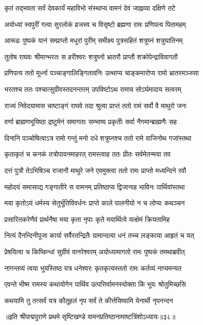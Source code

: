 \twolineshloka
{कृतं तद्भवता सर्वं देवकार्यं महाविभो}
{संस्थाप्य वामनं देवं जाह्नव्या दक्षिणे तटे}%

\twolineshloka
{अयोध्यां स्वपुरीं गत्वा सुरलोकं व्रजस्व च}
{विसृष्टो ब्रह्मणा रामः प्रणिपत्य पितामहम्}%

\twolineshloka
{आरूढः पुष्पकं यानं सम्प्राप्तो मधुरां पुरीम्}
{समीक्ष्य पुत्रसहितं शत्रुघ्नं शत्रुघातिनम्}%

\twolineshloka
{तुतोष राघवः श्रीमान्भरतः स हरीश्वरः}
{शत्रुघ्नो भ्रातरौ प्राप्तौ शक्रोपेन्द्राविवागतौ}%

\twolineshloka
{प्रणिपत्य ततो मूर्ध्ना पञ्चाङ्गालिङ्गितावनिः}
{उत्थाप्य चाङ्कमारोप्य रामो भ्रातरमञ्जसा}%

\twolineshloka
{भरतश्च ततः पश्चात्सुग्रीवस्तदनन्तरम्}
{उपविष्टोऽथ रामाय सोऽर्घमादाय सत्वरम्}%

\twolineshloka
{राज्यं निवेदयामास चाष्टाङ्गं राघवे तदा}
{श्रुत्वा प्राप्तं ततो रामं सर्वो वै माथुरो जनः}%

\twolineshloka
{वर्णा ब्राह्मणभूयिष्ठा द्रष्टुमेनं समागताः}
{सम्भाष्य प्रकृतीः सर्वा नैगमान्ब्राह्मणैः सह}%

\twolineshloka
{दिनानि पञ्चोषित्वाऽत्र रामो गन्तुं मनो दधे}
{शत्रुघ्नश्च ततो रामे वाजिनोथ गजांस्तथा}%

\twolineshloka
{कृताकृतं च कनकं तत्रोपायनमाहरत्}
{रामस्त्वाह ततः प्रीतः सर्वमेतन्मया तव}%

\twolineshloka
{दत्तं पुत्रौ तेऽभिषिञ्च राजानौ माथुरे जने}
{एवमुक्त्वा ततो रामः प्राप्तो मध्यन्दिने रवौ}%

\twolineshloka
{महोदयं समासाद्य गङ्गातीरे स वामनम्}
{प्रतिष्ठाप्य द्विजानाह भाविनः पार्थिवांस्तथा}%

\twolineshloka
{मया कृतोऽयं धर्मस्य सेतुर्भूतिविवर्धनः}
{प्राप्ते काले पालनीयो न च लोप्यः कथञ्चन}%

\twolineshloka
{प्रसारितकरेणैवं प्रार्थनैषा मया कृता}
{नृपाः कृते मयार्थित्वे यत्क्षेमं क्रियतामिह}%

\twolineshloka
{नित्यं दैनन्दिनीपूजा कार्या सर्वैरतन्द्रितैः}
{ग्रामान्दत्वा धनं तच्च लङ्काया आहृतं च यत्}%

\twolineshloka
{प्रेषयित्वा च किष्किन्धां सुग्रीवं वानरेश्वरम्}
{अयोध्यामागतो रामः पुष्पकं तमथाब्रवीत्}%

\twolineshloka
{नागन्तव्यं त्वया भूयस्तिष्ठ यत्र धनेश्वरः}
{कृतकृत्यस्ततो रामः कर्तव्यं नाप्यमन्यत}%


\twolineshloka
{एवन्ते भीष्म रामस्य कथायोगेन पार्थिव}
{उत्पत्तिर्वामनस्योक्ता किं भूयः श्रोतुमिच्छसि}%

\twolineshloka
{कथयामि तु तत्सर्वं यत्र कौतूहलं नृप}
{सर्वं ते कीर्त्तयिष्यामि येनार्थी नृपनन्दन}%

{॥इति श्रीपाद्मपुराणे प्रथमे सृष्टिखण्डे वामनप्रतिष्ठानामाष्टत्रिंशोऽध्यायः॥३८॥}

